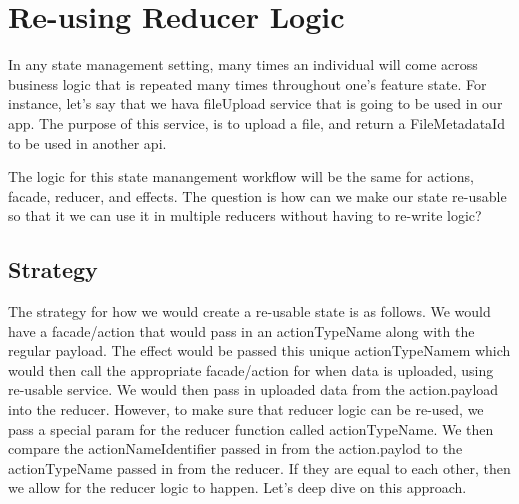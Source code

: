\maketitle{}
\section{ Re-using Reducer Logic }

In any state management setting, many times an individual will come across
business logic that is repeated many times throughout one's feature state. For
instance, let's say that we hava fileUpload service that is going to be used in
our app. The purpose of this service, is to upload a file, and return a
FileMetadataId to be used in another api.

The logic for this state manangement workflow will be the same for actions,
facade, reducer, and effects. The question is how can we make our state
re-usable so that it we can use it in multiple reducers without having to
re-write logic?

\subsection{ Strategy }

The strategy for how we would create a re-usable state is as follows. We would
have a facade/action that would pass in an actionTypeName along with the
regular payload. The effect would be passed this unique actionTypeNamem which
would then call the appropriate facade/action for when data is uploaded, using
re-usable service. We would then pass in uploaded data from the action.payload
into the reducer. However, to make sure that reducer logic can be re-used, we
pass a special param for the reducer function called actionTypeName. We then
compare the actionNameIdentifier passed in from the action.paylod to the
actionTypeName passed in from the reducer. If they are equal to each other, then
we allow for the reducer logic to happen. Let's deep dive on this approach.

